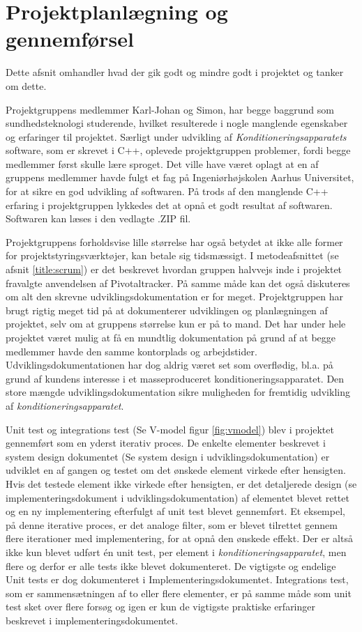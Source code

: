 \section{Projektplanlægning og gennemførsel}
Dette afsnit omhandler hvad der gik godt og mindre godt i projektet og tanker om dette.

Projektgruppens medlemmer Karl-Johan og Simon, har begge baggrund som sundhedsteknologi studerende, hvilket resulterede i nogle manglende egenskaber og erfaringer til projektet. Særligt under udvikling af \textit{Konditioneringsapparatets} software, som er skrevet i C++, oplevede projektgruppen problemer, fordi begge medlemmer først skulle lære sproget. Det ville have været oplagt at en af gruppens medlemmer havde fulgt et fag på Ingeniørhøjskolen Aarhus Universitet, for at sikre en god udvikling af softwaren. På trods af den manglende C++ erfaring i projektgruppen lykkedes det at opnå et godt resultat af softwaren. Softwaren kan læses i den vedlagte .ZIP fil.

Projektgruppens forholdsvise lille størrelse har også betydet at ikke alle former for projektstyringsværktøjer, kan betale sig tidsmæssigt. I metodeafsnittet (se afsnit \ref{title:scrum}) er det beskrevet hvordan gruppen halvvejs inde i projektet fravalgte anvendelsen af Pivotaltracker. På samme måde kan det også diskuteres om alt den skrevne udviklingsdokumentation er for meget. Projektgruppen har brugt rigtig meget tid på at dokumenterer udviklingen og planlægningen af projektet, selv om at gruppens størrelse kun er på to mand. Det har under hele projektet været mulig at få en mundtlig dokumentation på grund af at begge medlemmer havde den samme kontorplads og arbejdstider.
Udviklingsdokumentationen har dog aldrig været set som overflødig, bl.a. på grund af kundens interesse i et masseproduceret konditioneringsapparatet. Den store mængde udviklingsdokumentation sikre muligheden for fremtidig udvikling af \textit{konditioneringsapparatet}. 

Unit test og integrations test (Se V-model figur \ref{fig:vmodel}) blev i projektet gennemført som en yderst iterativ proces. De enkelte elementer beskrevet i system design dokumentet (Se system design i udviklingsdokumentation) er udviklet en af gangen og testet om det ønskede element virkede efter hensigten. Hvis det testede element ikke virkede efter hensigten, er det detaljerede design (se implementeringsdokument i udviklingsdokumentation) af elementet blevet rettet og en ny implementering efterfulgt af unit test blevet gennemført. Et eksempel, på denne iterative proces, er det analoge filter, som er blevet tilrettet gennem flere iterationer med implementering, for at opnå den ønskede effekt. Der er altså ikke kun blevet udført én unit test, per element i \textit{konditioneringsapparatet}, men flere og derfor er alle tests ikke blevet dokumenteret. De vigtigste og endelige Unit tests er dog dokumenteret i Implementeringsdokumentet. Integrations test, som er sammensætningen af to eller flere elementer, er på samme måde som unit test sket over flere forsøg og igen er kun de vigtigste praktiske erfaringer beskrevet i implementeringsdokumentet.

